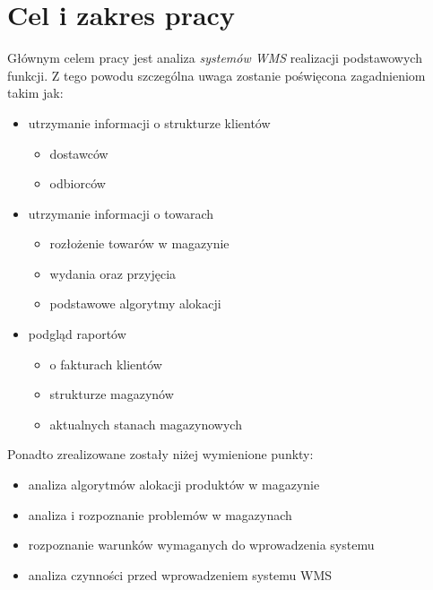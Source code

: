\section{Cel i zakres pracy}
	\hspace{10pt}Głównym celem pracy jest analiza \emph{systemów WMS} realizacji 
	podstawowych funkcji. Z tego powodu szczególna uwaga zostanie poświęcona zagadnieniom
	takim jak:
	\begin{itemize}
		\item utrzymanie informacji o strukturze klientów
		\begin{itemize}
			\item dostawców
			\item odbiorców
		\end{itemize}
		\item utrzymanie informacji o towarach
		\begin{itemize}
			\item rozłożenie towarów w magazynie
			\item wydania oraz przyjęcia
			\item podstawowe algorytmy alokacji
		\end{itemize}
		\item podgląd raportów
		\begin{itemize}
			\item o fakturach klientów
			\item strukturze magazynów
			\item aktualnych stanach magazynowych
		\end{itemize}
	\end{itemize}
	
	Ponadto zrealizowane zostały niżej wymienione punkty:
	\begin{itemize}
		\item analiza algorytmów alokacji produktów w magazynie
		\item analiza i rozpoznanie problemów w magazynach
		\item rozpoznanie warunków wymaganych do wprowadzenia systemu
		\item analiza czynności przed wprowadzeniem systemu WMS
	\end{itemize}

